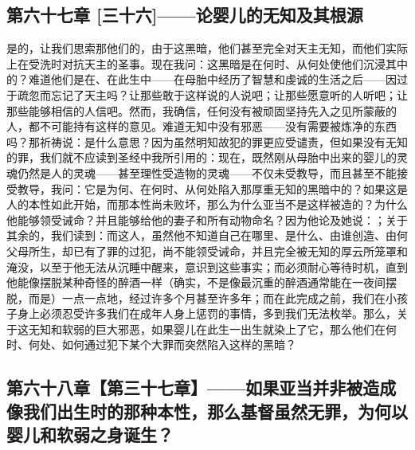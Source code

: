 
\subsection{第六十七章 [三十六]——论婴儿的无知及其根源}

是的，让我们思索那他们的，由于这黑暗，他们甚至完全对天主无知，而他们实际上在受洗时对抗天主的圣事。现在我问：这黑暗是在何时、从何处使他们沉浸其中的？难道他们是在、在此生中——在母胎中经历了智慧和虔诚的生活之后——因过于疏忽而忘记了天主吗？让那些敢于这样说的人说吧；让那些愿意听的人听吧；让那些能够相信的人信吧。然而，我确信，任何没有被顽固坚持先入之见所蒙蔽的人，都不可能持有这样的意见。难道无知中没有邪恶——没有需要被炼净的东西吗？那祈祷说：是什么意思？因为虽然明知故犯的罪更应受谴责，但如果没有无知的罪，我们就不应读到圣经中我所引用的：现在，既然刚从母胎中出来的婴儿的灵魂仍然是人的灵魂——甚至理性受造物的灵魂——不仅未受教导，而且甚至不能接受教导，我问：它是为何、在何时、从何处陷入那厚重无知的黑暗中的？如果这是人的本性如此开始，而那本性尚未败坏，那么为什么亚当不是这样被造的？为什么他能够领受诫命？并且能够给他的妻子和所有动物命名？因为他论及她说：；关于其余的，我们读到：而这人，虽然他不知道自己在哪里、是什么、由谁创造、由何父母所生，却已有了罪的过犯，尚不能领受诫命，并且完全被无知的厚云所笼罩和淹没，以至于他无法从沉睡中醒来，意识到这些事实；而必须耐心等待时机，直到他能像摆脱某种奇怪的醉酒一样（确实，不是像最沉重的醉酒通常能在一夜间摆脱，而是）一点一点地，经过许多个月甚至许多年；而在此完成之前，我们在小孩子身上必须忍受许多我们在成年人身上惩罚的事情，多到我们无法枚举。那么，关于这无知和软弱的巨大邪恶，如果婴儿在此生一出生就染上了它，那么他们在何时、何处、如何通过犯下某个大罪而突然陷入这样的黑暗？\par


\subsection{第六十八章【第三十七章】——如果亚当并非被造成像我们出生时的那种本性，那么基督虽然无罪，为何以婴儿和软弱之身诞生？}

